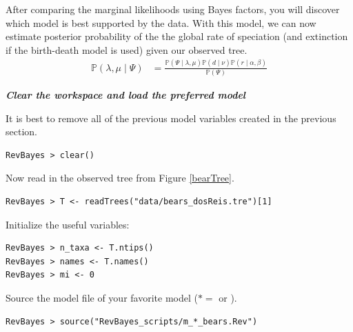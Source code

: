 After comparing the marginal likelihoods using Bayes factors, you will discover which model is best supported by the data. 
With this model, we can now estimate posterior probability of the the global rate of speciation (and extinction if the birth-death model is used) given our observed tree.
\begin{align}\label{bayesTher2}
\mathbb{P}(\lambda, \mu \mid \Psi) &= \frac{\mathbb{P}(\Psi \mid \lambda, \mu)\mathbb{P}(d \mid \nu)\mathbb{P}(r \mid \alpha, \beta)}{\mathbb{P}(\Psi)}
\end{align}




\textbf{\textit{Clear the workspace and load the preferred model}}

It is best to remove all of the previous model variables created in the previous section.
{\tt \begin{snugshade*}
\begin{lstlisting}
RevBayes > clear()
\end{lstlisting}
\end{snugshade*}}


Now read in the observed tree from Figure \ref{bearTree}. 
{\tt \begin{snugshade*}
\begin{lstlisting}
RevBayes > T <- readTrees("data/bears_dosReis.tre")[1]
\end{lstlisting}
\end{snugshade*}}

Initialize the useful variables:
{\tt \begin{snugshade*}
\begin{lstlisting}
RevBayes > n_taxa <- T.ntips()
RevBayes > names <- T.names()
RevBayes > mi <- 0 
\end{lstlisting}
\end{snugshade*}}



Source the model file of your favorite model ($* = $  or ).
{\tt \begin{snugshade*}
\begin{lstlisting}
RevBayes > source("RevBayes_scripts/m_*_bears.Rev")
\end{lstlisting}
\end{snugshade*}}

